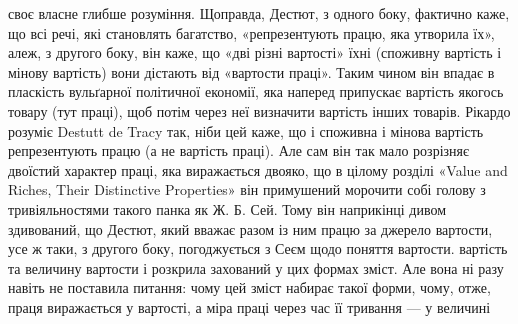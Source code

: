 {своє власне глибше розуміння. Щоправда, Дестют, з одного боку, фактично каже, що всі речі, які
становлять багатство, «репрезентують працю, яка утворила їх», алеж, з другого боку, він каже, що
«дві різні вартості» їхні (споживну вартість і мінову вартість) вони дістають від «вартости праці».
Таким чином він впадає в пласкість вульґарної політичної економії, яка наперед припускає вартість
якогось товару (тут праці), щоб потім через неї визначити вартість інших товарів. Рікардо розуміє
Destutt de Tracy так, ніби цей каже, що і споживна і мінова вартість репрезентують працю (а не
вартість праці). Але сам він так мало розрізняє двоїстий характер праці, яка виражається двояко, що
в цілому розділі «Value and Riches, Their Distinctive Properties» він примушений морочити собі
голову з тривіяльностями такого панка як Ж. Б. Сей. Тому він наприкінці дивом здивований, що Дестют,
який вважає разом із ним працю за джерело вартости, усе ж таки, з другого боку, погоджується з Сеєм
щодо поняття вартости.
} вартість та величину вартости і
розкрила захований у цих формах зміст. Але вона ні разу навіть не поставила питання: чому цей зміст
набирає такої форми, чому, отже, праця виражається у вартості, а міра праці через час її тривання —
у величині
\parbreak{}  %
